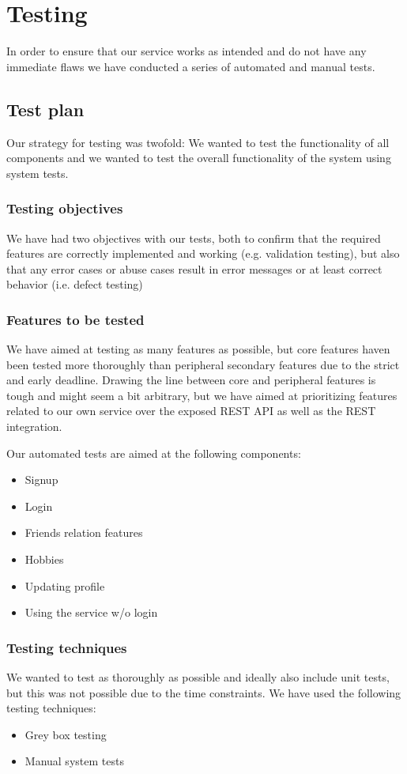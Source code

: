\documentclass[a4paper]{article}
\begin{document}
\section{Testing}
In order to ensure that our service works as intended and do not have any immediate flaws we have conducted a series of automated and manual tests.

\subsection{Test plan}
Our strategy for testing was twofold: We wanted to test the functionality of all components and we wanted to test the overall functionality of the system using system tests.

\subsubsection{Testing objectives}
We have had two objectives with our tests, both to confirm that the required features are correctly implemented and working (e.g. validation testing), but also that any error cases or abuse cases result in error messages or at least correct behavior (i.e. defect testing)

\subsubsection{Features to be tested}
We have aimed at testing as many features as possible, but core features haven been tested more thoroughly than peripheral secondary features due to the strict and early deadline. Drawing the line between core and peripheral features is tough and might seem a bit arbitrary, but we have aimed at prioritizing features related to our own service over the exposed REST API as well as the REST integration.

Our automated tests are aimed at the following components:
\begin{itemize}
\item Signup
\item Login
\item Friends relation features
\item Hobbies
\item Updating profile
\item Using the service w/o login
\end{itemize}
\subsubsection{Testing techniques}
We wanted to test as thoroughly as possible and ideally also include unit tests, but this was not possible due to the time constraints.
We have used the following testing techniques:
\begin{itemize}
\item Grey box testing
\item Manual system tests
\end{itemize}
\end{document}
